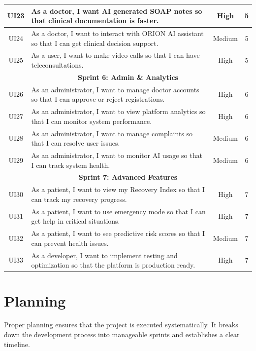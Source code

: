 \documentclass[12pt,a4paper,oneside]{report}
\begin{document}
\begin{longtable}{|c|p{7.5cm}|c|c|}
\hline
UI23 & As a doctor, I want AI generated SOAP notes so that clinical documentation is faster. & High & 5 \\
\hline
UI24 & As a doctor, I want to interact with ORION AI assistant so that I can get clinical decision support. & Medium & 5 \\
\hline
UI25 & As a user, I want to make video calls so that I can have teleconsultations. & High & 5 \\
\hline
\multicolumn{4}{|c|}{\textbf{Sprint 6: Admin \& Analytics}} \\
\hline
UI26 & As an administrator, I want to manage doctor accounts so that I can approve or reject registrations. & High & 6 \\
\hline
UI27 & As an administrator, I want to view platform analytics so that I can monitor system performance. & High & 6 \\
\hline
UI28 & As an administrator, I want to manage complaints so that I can resolve user issues. & Medium & 6 \\
\hline
UI29 & As an administrator, I want to monitor AI usage so that I can track system health. & Medium & 6 \\
\hline
\multicolumn{4}{|c|}{\textbf{Sprint 7: Advanced Features}} \\
\hline
UI30 & As a patient, I want to view my Recovery Index so that I can track my recovery progress. & High & 7 \\
\hline
UI31 & As a patient, I want to use emergency mode so that I can get help in critical situations. & High & 7 \\
\hline
UI32 & As a patient, I want to see predictive risk scores so that I can prevent health issues. & Medium & 7 \\
\hline
UI33 & As a developer, I want to implement testing and optimization so that the platform is production ready. & High & 7 \\
\hline
\end{longtable}

\section{Planning}

Proper planning ensures that the project is executed systematically. It breaks down the development process into manageable sprints and establishes a clear timeline.

\end{document}
